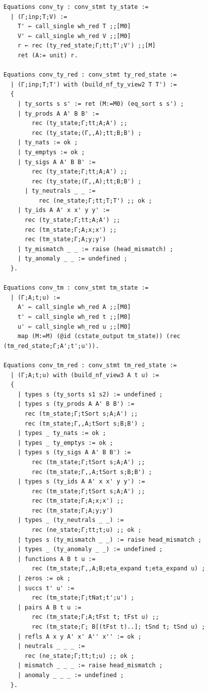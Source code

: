 \begin{lstlisting}
Equations conv_ty : conv_stmt ty_state :=
  | (Γ;inp;T;V) :=
    T' ← call_single wh_red T ;;[M0]
    V' ← call_single wh_red V ;;[M0]
    r ← rec (ty_red_state;Γ;tt;T';V') ;;[M]
    ret (A:= unit) r.

Equations conv_ty_red : conv_stmt ty_red_state :=
  | (Γ;inp;T;T') with (build_nf_ty_view2 T T') :=
  {
    | ty_sorts s s' := ret (M:=M0) (eq_sort s s') ;
    | ty_prods A A' B B' :=
        rec (ty_state;Γ;tt;A;A') ;;
        rec (ty_state;(Γ,,A);tt;B;B') ;
    | ty_nats := ok ;
    | ty_emptys := ok ;
    | ty_sigs A A' B B' :=
        rec (ty_state;Γ;tt;A;A') ;;
        rec (ty_state;(Γ,,A);tt;B;B') ;
      | ty_neutrals _ _ :=
          rec (ne_state;Γ;tt;T;T') ;; ok ;
    | ty_ids A A' x x' y y' :=
      rec (ty_state;Γ;tt;A;A') ;;
      rec (tm_state;Γ;A;x;x') ;;
      rec (tm_state;Γ;A;y;y')
    | ty_mismatch _ _ := raise (head_mismatch) ;
    | ty_anomaly _ _ := undefined ;
  }.

Equations conv_tm : conv_stmt tm_state :=
  | (Γ;A;t;u) :=
    A' ← call_single wh_red A ;;[M0]
    t' ← call_single wh_red t ;;[M0]
    u' ← call_single wh_red u ;;[M0]
    map (M:=M) (@id (cstate_output tm_state)) (rec (tm_red_state;Γ;A';t';u')).

Equations conv_tm_red : conv_stmt tm_red_state :=
  | (Γ;A;t;u) with (build_nf_view3 A t u) :=
  {
    | types s (ty_sorts s1 s2) := undefined ;
    | types s (ty_prods A A' B B') :=
      rec (tm_state;Γ;tSort s;A;A') ;;
      rec (tm_state;Γ,,A;tSort s;B;B') ;
    | types _ ty_nats := ok ;
    | types _ ty_emptys := ok ;
    | types s (ty_sigs A A' B B') :=
        rec (tm_state;Γ;tSort s;A;A') ;;
        rec (tm_state;Γ,,A;tSort s;B;B') ;
    | types s (ty_ids A A' x x' y y') :=
        rec (tm_state;Γ;tSort s;A;A') ;;
        rec (tm_state;Γ;A;x;x') ;;
        rec (tm_state;Γ;A;y;y')
    | types _ (ty_neutrals _ _) :=
        rec (ne_state;Γ;tt;t;u) ;; ok ;
    | types s (ty_mismatch _ _) := raise head_mismatch ;
    | types _ (ty_anomaly _ _) := undefined ;
    | functions A B t u :=
        rec (tm_state;Γ,,A;B;eta_expand t;eta_expand u) ;
    | zeros := ok ;
    | succs t' u' :=
        rec (tm_state;Γ;tNat;t';u') ;
    | pairs A B t u :=
        rec (tm_state;Γ;A;tFst t; tFst u) ;;
        rec (tm_state;Γ; B[(tFst t)..]; tSnd t; tSnd u) ;
    | refls A x y A' x' A'' x'' := ok ;
    | neutrals _ _ _ :=
      rec (ne_state;Γ;tt;t;u) ;; ok ;
    | mismatch _ _ _ := raise head_mismatch ;
    | anomaly _ _ _ := undefined ;
  }.


\end{lstlisting}
